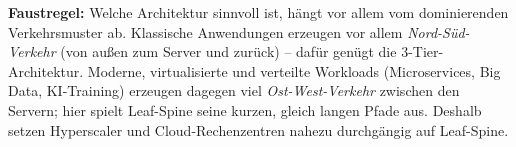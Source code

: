 \noindent\textbf{Faustregel:} Welche Architektur sinnvoll ist, hängt vor allem
vom dominierenden Verkehrsmuster ab. Klassische Anwendungen erzeugen vor allem
\emph{Nord-Süd-Verkehr} (von außen zum Server und zurück) – dafür genügt die
3-Tier-Architektur. Moderne, virtualisierte und verteilte Workloads
(Microservices, Big Data, KI-Training) erzeugen dagegen viel
\emph{Ost-West-Verkehr} zwischen den Servern; hier spielt Leaf-Spine seine
kurzen, gleich langen Pfade aus. Deshalb setzen Hyperscaler und
Cloud-Rechenzentren nahezu durchgängig auf Leaf-Spine.

